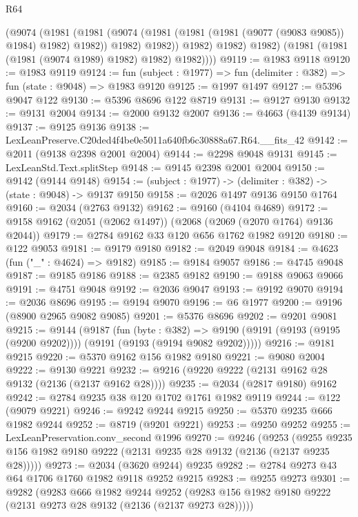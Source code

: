 \begin{lexlean}{R64}
\begin{coremodule}
                (@9074
                  (@1981
                    (@1981
                      (@9074 (@1981 (@1981 (@1981 (@9077 (@9083 @9085)) @1984) @1982) @1982))
                      @1982)
                    @1982))
                @1982)
              @1982)
            @1982)
          (@1981 (@1981 (@1981 (@9074 @1989) @1982) @1982) @1982))))
@9119 := @1983 @9118
@9120 := @1983 @9119
@9124 := fun (subject : @1977) => fun (delimiter : @382) => fun (state : @9048) => @1983 @9120
@9125 := @1997 @1497
@9127 := @5396 @9047 @122
@9130 := @5396 @8696 @122 @8719
@9131 := @9127 @9130
@9132 := @9131 @2004
@9134 := @2000 @9132 @2007
@9136 := @4663 (@4139 @9134)
@9137 := @9125 @9136
@9138 := LexLeanPreserve.C20ded4f4be0e5011a640fb6c30888a67.R64.__fits_42
@9142 := @2011 (@9138 @2398 @2001 @2004)
@9144 := @2298 @9048 @9131
@9145 := LexLeanStd.Text.splitStep
@9148 := @9145 @2398 @2001 @2004
@9150 := @9142 (@9144 @9148)
@9154 := (subject : @1977) -> (delimiter : @382) -> (state : @9048) -> @9137 @9150
@9158 := @2026 @1497 @9136 @9150 @1764
@9160 := @2034 (@2763 @9132)
@9162 := @9160 (@4104 @4689)
@9172 := @9158 @9162 (@2051 (@2062 @1497)) (@2068 (@2069 (@2070 @1764) @9136 @2044))
@9179 := @2784 @9162 @33 @120 @656 @1762 @1982 @9120
@9180 := @122 @9053
@9181 := @9179 @9180
@9182 := @2049 @9048
@9184 := @4623 (fun ("_" : @4624) => @9182)
@9185 := @9184 @9057
@9186 := @4745 @9048
@9187 := @9185 @9186
@9188 := @2385 @9182
@9190 := @9188 @9063 @9066
@9191 := @4751 @9048
@9192 := @2036 @9047
@9193 := @9192 @9070
@9194 := @2036 @8696
@9195 := @9194 @9070
@9196 := @6 @1977
@9200 := @9196 (@8900 @2965 @9082 @9085)
@9201 := @5376 @8696
@9202 := @9201 @9081
@9215 := @9144
    (@9187
      (fun (byte : @382) =>
      @9190 (@9191 (@9193 (@9195 (@9200 @9202)))) (@9191 (@9193 (@9194 @9082 @9202)))))
@9216 := @9181 @9215
@9220 := @5370 @9162 @156 @1982 @9180
@9221 := @9080 @2004
@9222 := @9130 @9221
@9232 := @9216 (@9220 @9222 (@2131 @9162 @28 @9132 (@2136 (@2137 @9162 @28))))
@9235 := @2034 (@2817 @9180) @9162
@9242 := @2784 @9235 @38 @120 @1702 @1761 @1982 @9119
@9244 := @122 (@9079 @9221)
@9246 := @9242 @9244 @9215
@9250 := @5370 @9235 @666 @1982 @9244
@9252 := @8719 (@9201 @9221)
@9253 := @9250 @9252
@9255 := LexLeanPreservation.conv_second @1996
@9270 := @9246
    (@9253 (@9255 @9235 @156 @1982 @9180 @9222 (@2131 @9235 @28 @9132 (@2136 (@2137 @9235 @28)))))
@9273 := @2034 (@3620 @9244) @9235
@9282 := @2784 @9273 @43 @64 @1706 @1760 @1982 @9118 @9252 @9215
@9283 := @9255 @9273
@9301 := @9282
    (@9283
      @666
      @1982
      @9244
      @9252
      (@9283 @156 @1982 @9180 @9222 (@2131 @9273 @28 @9132 (@2136 (@2137 @9273 @28)))))

\end{coremodule}
\end{lexlean}
